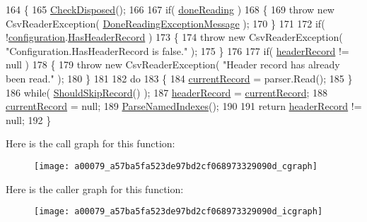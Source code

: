 \begin{DoxyCode}
164         \{
165             \hyperlink{a00079_a6fa45a46ed1322dc1872ca2321b5edbc}{CheckDisposed}();
166 
167             \textcolor{keywordflow}{if}( \hyperlink{a00079_a04a4a668ae50f5383cdd2a1691bbd718}{doneReading} )
168             \{
169                 \textcolor{keywordflow}{throw} \textcolor{keyword}{new} CsvReaderException( \hyperlink{a00079_abea2bd0359f517019984de31f9d9fb96}{DoneReadingExceptionMessage} );
170             \}
171 
172             \textcolor{keywordflow}{if}( !\hyperlink{a00079_a695622911e45cbac8d67dcbd9a3e2967}{configuration}.\hyperlink{a00065_a9e439f90bfac500d24d6e2e731240439}{HasHeaderRecord} )
173             \{
174                 \textcolor{keywordflow}{throw} \textcolor{keyword}{new} CsvReaderException( \textcolor{stringliteral}{"Configuration.HasHeaderRecord is false."} );
175             \}
176 
177             \textcolor{keywordflow}{if}( \hyperlink{a00079_aa6e5fd8aa2961442ca1caf7a4ac54d65}{headerRecord} != null )
178             \{
179                 \textcolor{keywordflow}{throw} \textcolor{keyword}{new} CsvReaderException( \textcolor{stringliteral}{"Header record has already been read."} );
180             \}
181 
182             \textcolor{keywordflow}{do}
183             \{
184                 \hyperlink{a00079_ab2bfef15784add66e441c9d3a0d73751}{currentRecord} = parser.Read();
185             \}
186             \textcolor{keywordflow}{while}( \hyperlink{a00079_a3b8db0163b61e20d56ed8626e21338d6}{ShouldSkipRecord}() );
187             \hyperlink{a00079_aa6e5fd8aa2961442ca1caf7a4ac54d65}{headerRecord} = \hyperlink{a00079_ab2bfef15784add66e441c9d3a0d73751}{currentRecord};
188             \hyperlink{a00079_ab2bfef15784add66e441c9d3a0d73751}{currentRecord} = null;
189             \hyperlink{a00079_afc1150ed2f9ed7c9e87238e65a5e12e9}{ParseNamedIndexes}();
190 
191             \textcolor{keywordflow}{return} \hyperlink{a00079_aa6e5fd8aa2961442ca1caf7a4ac54d65}{headerRecord} != null;
192         \}
\end{DoxyCode}


Here is the call graph for this function\-:
\nopagebreak
\begin{figure}[H]
\begin{center}
\leavevmode
\texttt{[image: a00079\_a57ba5fa523de97bd2cf068973329090d\_cgraph]}
\end{center}
\end{figure}




Here is the caller graph for this function\-:
\nopagebreak
\begin{figure}[H]
\begin{center}
\leavevmode
\texttt{[image: a00079\_a57ba5fa523de97bd2cf068973329090d\_icgraph]}
\end{center}
\end{figure}


